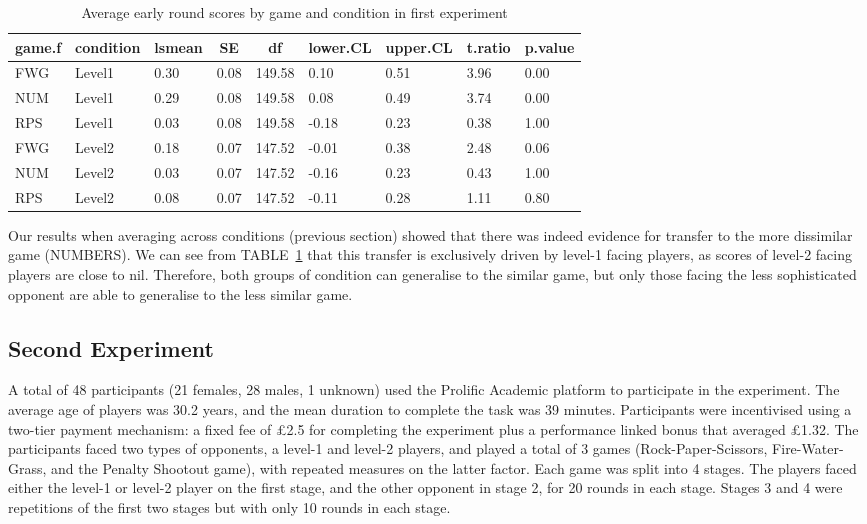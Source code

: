 \documentclass[man,floatsintext]{apa6}
\begin{document}
\begin{table}[tbp]
\begin{center}
\begin{threeparttable}
\caption{\label{tab:table-early-scores}Average early round scores by game and condition in first experiment}
\begin{tabular}{lllllllll}
\toprule
game.f & \multicolumn{1}{c}{condition} & \multicolumn{1}{c}{lsmean} & \multicolumn{1}{c}{SE} & \multicolumn{1}{c}{df} & \multicolumn{1}{c}{lower.CL} & \multicolumn{1}{c}{upper.CL} & \multicolumn{1}{c}{t.ratio} & \multicolumn{1}{c}{p.value}\\
\midrule
FWG & Level1 & 0.30 & 0.08 & 149.58 & 0.10 & 0.51 & 3.96 & 0.00\\
NUM & Level1 & 0.29 & 0.08 & 149.58 & 0.08 & 0.49 & 3.74 & 0.00\\
RPS & Level1 & 0.03 & 0.08 & 149.58 & -0.18 & 0.23 & 0.38 & 1.00\\
FWG & Level2 & 0.18 & 0.07 & 147.52 & -0.01 & 0.38 & 2.48 & 0.06\\
NUM & Level2 & 0.03 & 0.07 & 147.52 & -0.16 & 0.23 & 0.43 & 1.00\\
RPS & Level2 & 0.08 & 0.07 & 147.52 & -0.11 & 0.28 & 1.11 & 0.80\\
\bottomrule
\end{tabular}
\end{threeparttable}
\end{center}
\end{table}

Our results when averaging across conditions (previous section) showed that there was indeed evidence for transfer to the more dissimilar game (NUMBERS). We can see from TABLE~\ref{tab:table-early-scores} that this transfer is exclusively driven by level-1 facing players, as scores of level-2 facing players are close to nil. Therefore, both groups of condition can generalise to the similar game, but only those facing the less sophisticated opponent are able to generalise to the less similar game.

\hypertarget{second-experiment-1}{%
\subsection{Second Experiment}\label{second-experiment-1}}

A total of 48 participants (21 females, 28 males, 1 unknown) used the Prolific Academic platform to participate in the experiment. The average age of players was 30.2 years, and the mean duration to complete the task was 39 minutes. Participants were incentivised using a two-tier payment mechanism: a fixed fee of £2.5 for completing the experiment plus a performance linked bonus that averaged £1.32. The participants faced two types of opponents, a level-1 and level-2 players, and played a total of 3 games (Rock-Paper-Scissors, Fire-Water-Grass, and the Penalty Shootout game), with repeated measures on the latter factor. Each game was split into 4 stages. The players faced either the level-1 or level-2 player on the first stage, and the other opponent in stage 2, for 20 rounds in each stage. Stages 3 and 4 were repetitions of the first two stages but with only 10 rounds in each stage.
\end{document}
